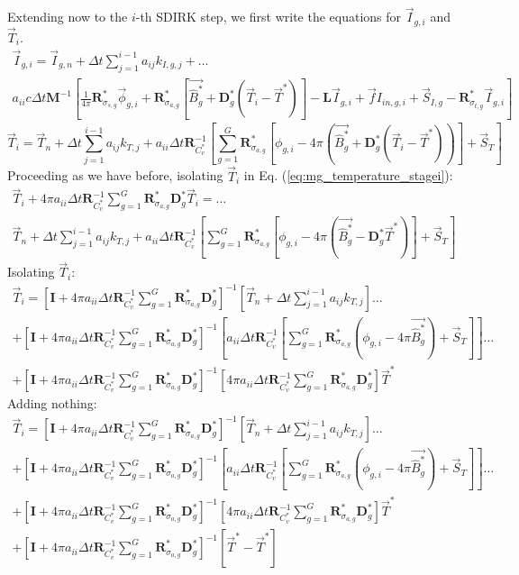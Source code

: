 \documentclass[11pt]{article}
\newcommand{\benum}{\begin{equation}}
\newcommand{\eenum}{\end{equation}}
\newcommand{\eqt}[1]{Eq. (\ref{#1})}
\newcommand{\M}{\ensuremath{ \mathbf M}}
\newcommand{\R}{\ensuremath{{\mathbf R}}}
\newcommand{\Rag}{\ensuremath{{\mathbf R}_{\sigma_{a,g}}^*}}
\newcommand{\Rsg}{\ensuremath{{\mathbf R}_{\sigma_{s,g}}^*}}
\newcommand{\Rtg}{\ensuremath{{\mathbf R}_{\sigma_{t,g}}^*}}
\newcommand{\Dg}{\ensuremath{ \mathbf D}^*_g}
\newcommand{\Pgvec}{\ensuremath{ \vec{\widehat{B}^*_g}}}
\newcommand{\I}{\ensuremath{\mathbf{I}}}
\begin{document}
Extending now to the $i$-th SDIRK step, we first write the equations for $\vec{I}_{g,i}$ and $\vec{T}_i$.
\begin{multline}
\vec{I}_{g,i} = \vec{I}_{g,n} + \Delta t \sum_{j=1}^{i-1}{a_{ij} k_{I,g,j}} + \dots \\
a_{ii} c \Delta t \M^{-1} \left[
\frac{1}{4\pi}\Rsg \vec{\phi}_{g,i} + \Rag \left[\Pgvec +\Dg \left(\vec{T}_i - \vec{T}^*\right)  \right] - \mathbf{ L}\vec{I}_{g,i} + \vec{f}I_{in,g,i} + \vec{S}_{I,g} - \Rtg \vec{I}_{g,i}  
\right] 
\label{eq:mg_intensity_stagei}
\end{multline}
%
\benum
\vec{T}_i = \vec{T}_n + \Delta t \sum_{j=1}^{i-1}{a_{ij} k_{T,j}} + a_{ii} \Delta t \R_{C_v^*}^{-1} \left[ \sum_{g=1}^G{\Rag \left[\phi_{g,i} - 4\pi \left(\Pgvec  + \Dg \left(\vec{T}_i - \vec{T}^*  \right)\right)  \right] } + \vec{S}_T \right]  
\label{eq:mg_temperature_stagei}
\eenum
Proceeding as we have before, isolating $\vec{T}_i$ in \eqt{eq:mg_temperature_stagei}:
\begin{multline*}
\vec{T}_i + 4\pi a_{ii} \Delta t \R_{C_v^*}^{-1} \sum_{g=1}^G{\Rag \Dg  } \vec{T}_i = \dots \\
\vec{T}_n + \Delta t \sum_{j=1}^{i-1}{a_{ij} k_{T,j}} + a_{ii} \Delta t \R_{C_v^*}^{-1}
 \left[ \sum_{g=1}^G{ \Rag \left[\phi_{g,i} - 4\pi \left(\Pgvec - \Dg \vec{T}^* \right) \right] } + \vec{S}_T \right]
\end{multline*}
Isolating $\vec{T}_i$:
\begin{multline*}
\vec{T}_i = \left[\I+ 4\pi a_{ii} \Delta t \R_{C_v^*}^{-1} \sum_{g=1}^G{\Rag \Dg } \right]^{-1} \left[\vec{T}_n + \Delta t \sum_{j=1}^{i-1}{a_{ij} k_{T,j}}\right] \dots \\
+ \left[\I + 4\pi a_{ii} \Delta t \R_{C_v^*}^{-1}\sum_{g=1}^G{\Rag \Dg  }  \right]^{-1}
\left[a_{ii} \Delta t \R_{C_v^*}^{-1} \left[ \sum_{g=1}^G{\Rag \left(\phi_{g,i} - 4\pi \Pgvec \right)  } + \vec{S}_T \right] \right]  \dots \\
+ \left[\I+ 4\pi a_{ii} \Delta t \R_{C_v^*}^{-1}\sum_{g=1}^G{\Rag  \Dg  }   \right]^{-1}
\left[4\pi a_{ii}\Delta t\R_{C_v^*}^{-1}\sum_{g=1}^G{\Rag  \Dg } \right] \vec{T}^*
\end{multline*}
%
Adding nothing:
%
\begin{multline*}
\vec{T}_i = \left[\I+ 4\pi a_{ii} \Delta t \R_{C_v^*}^{-1} \sum_{g=1}^G{\Rag  \Dg  }  \right]^{-1} \left[\vec{T}_n + \Delta t \sum_{j=1}^{i-1}{a_{ij} k_{T,j}}\right] \dots \\
+ \left[\I + 4\pi a_{ii} \Delta t \R_{C_v^*}^{-1} \sum_{g=1}^G{\Rag \Dg  }   \right]^{-1}
\left[a_{ii} \Delta t \R_{C_v^*}^{-1} \left[ \sum_{g=1}^G{\Rag \left(\phi_{g,i} - 4\pi \Pgvec \right)  }  + \vec{S}_T \right] \right] \dots \\
+ \left[\I + 4\pi a_{ii} \Delta t \R_{C_v^*}^{-1} \sum_{g=1}^G{\Rag \Dg  }   \right]^{-1}
\left[4\pi a_{ii}\Delta t\R_{C_v^*}^{-1}\sum_{g=1}^G{\Rag  \Dg }\right] \vec{T}^* \\
+ \left[\I+ 4\pi a_{ii} \Delta t \R_{C_v^*}^{-1} \sum_{g=1}^G{\Rag \Dg  }   \right]^{-1}\left[\vec{T}^* - \vec{T}^*  \right]
\end{multline*}
\end{document}
